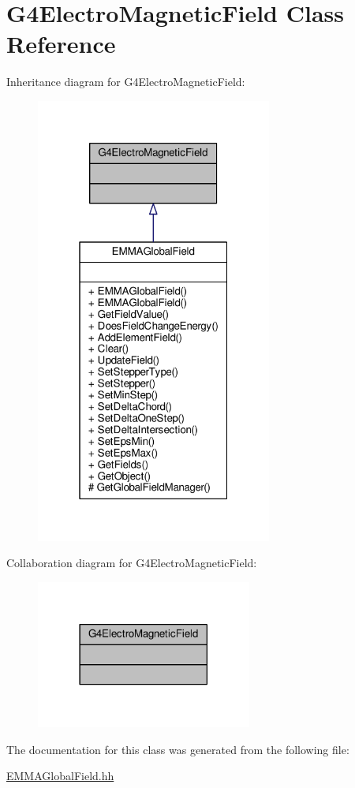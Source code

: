 \hypertarget{classG4ElectroMagneticField}{}\section{G4\+Electro\+Magnetic\+Field Class Reference}
\label{classG4ElectroMagneticField}


Inheritance diagram for G4\+Electro\+Magnetic\+Field\+:
\nopagebreak
\begin{figure}[H]
\begin{center}
\leavevmode
\includegraphics[width=220pt]{classG4ElectroMagneticField__inherit__graph}
\end{center}
\end{figure}


Collaboration diagram for G4\+Electro\+Magnetic\+Field\+:
\nopagebreak
\begin{figure}[H]
\begin{center}
\leavevmode
\includegraphics[width=201pt]{classG4ElectroMagneticField__coll__graph}
\end{center}
\end{figure}


The documentation for this class was generated from the following file\+:\begin{DoxyCompactItemize}
\item 
\hyperlink{EMMAGlobalField_8hh}{E\+M\+M\+A\+Global\+Field.\+hh}\end{DoxyCompactItemize}
